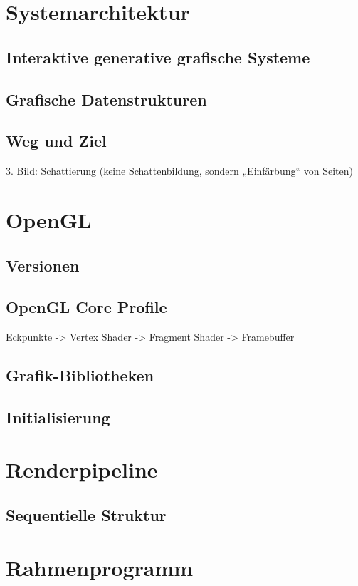\section{Systemarchitektur}
\subsection{Interaktive generative grafische Systeme}
\subsection{Grafische Datenstrukturen}
\subsection{Weg und Ziel}
3. Bild: Schattierung (keine Schattenbildung, sondern „Einfärbung“ von Seiten)

\section{OpenGL}
\subsection{Versionen}
\subsection{OpenGL Core Profile}
Eckpunkte -> Vertex Shader -> Fragment Shader -> Framebuffer
\subsection{Grafik-Bibliotheken}
\subsection{Initialisierung}

\section{Renderpipeline}
\subsection{Sequentielle Struktur}

\section{Rahmenprogramm}
